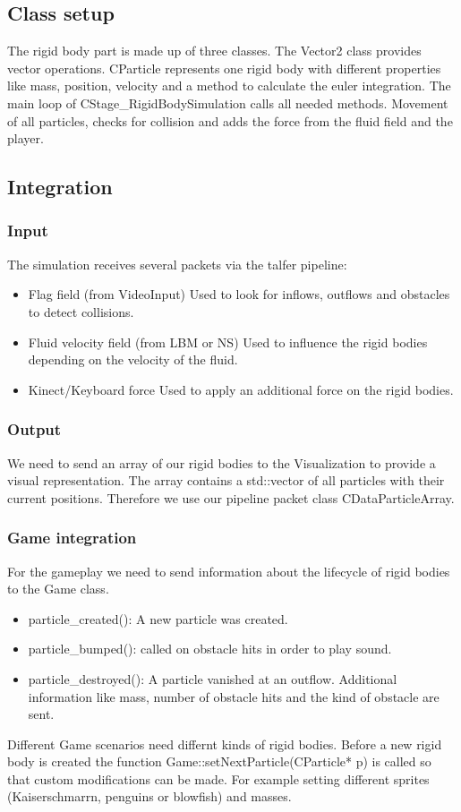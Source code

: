 
\subsection{Class setup}
The rigid body part is made up of three classes. The Vector2 class provides vector operations. CParticle represents one rigid body with different properties like mass, position, velocity and a method to calculate the euler integration. The main loop of CStage\_RigidBodySimulation calls all needed methods. Movement of all particles, checks for collision and adds the force from the fluid field and the player.
\subsection{Integration}
\subsubsection{Input}
The simulation receives several packets via the talfer pipeline:
\begin{itemize}
\item Flag field (from VideoInput)
Used to look for inflows, outflows and obstacles to detect collisions.
\item Fluid velocity field (from LBM or NS)
Used to influence the rigid bodies depending on the velocity of the fluid.
\item Kinect/Keyboard force
Used to apply an additional force on the rigid bodies.
\end{itemize}
\subsubsection{Output}
We need to send an array of our rigid bodies to the Visualization to provide a visual representation. The array contains a std::vector of all particles with their current positions.
Therefore we use our pipeline packet class CDataParticleArray.
\subsubsection{Game integration}
For the gameplay we need to send information about the lifecycle of rigid bodies to the Game class.
\begin{itemize}
\item particle\_created(): A new particle was created.
\item particle\_bumped(): called on obstacle hits in order to play sound.
\item particle\_destroyed(): A particle vanished at an outflow. Additional information like mass, number of obstacle hits and the kind of obstacle are sent.
\end{itemize}
Different Game scenarios need differnt kinds of rigid bodies. Before a new rigid body is created the function Game::setNextParticle(CParticle* p) is called so that custom modifications can be made. For example setting different sprites (Kaiserschmarrn, penguins or blowfish) and masses.
